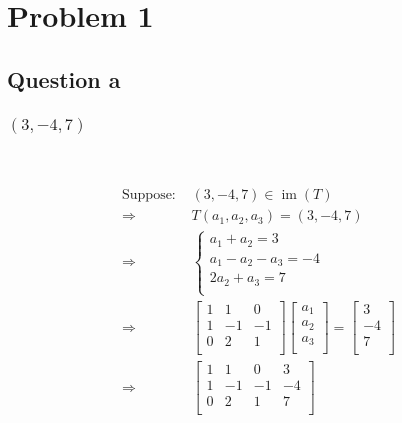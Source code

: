 \documentclass{article}
\DeclareMathOperator{\im}{im}
\begin{document}
\section{Problem 1}

\subsection{Question a}

\subsubsection{$(3,-4,7)$}

~

\begin{equation*}
    \begin{split}
        \text{Suppose: }&(3,-4,7)\in \im(T)\\
        \Rightarrow &T(a_1,a_2,a_3)=(3,-4,7)\\
        \Rightarrow &\begin{cases}
            a_1+a_2=3\\
            a_1-a_2-a_3=-4\\
            2a_2+a_3=7\\
        \end{cases}\\
        \Rightarrow&\begin{bmatrix}
            1&1&0\\
            1&-1&-1\\
            0&2&1\\
        \end{bmatrix}\begin{bmatrix}
            a_1\\
            a_2\\
            a_3\\
        \end{bmatrix}=\begin{bmatrix}
            3\\
            -4\\
            7\\
        \end{bmatrix}\\
        \Rightarrow&\left[\begin{array}{ccc|c}
            1&1&0&3\\
            1&-1&-1&-4\\
            0&2&1&7\\
        \end{array}\right]\\

\end{split}
\end{equation*}
\end{document}
